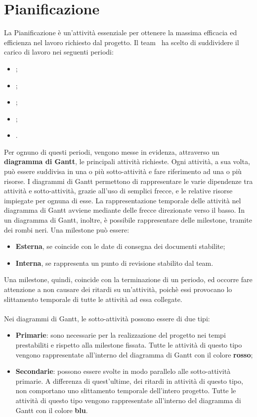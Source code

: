 \newpage

\section{Pianificazione}
La Pianificazione è un'attività essenziale per ottenere la massima efficacia ed efficienza nel lavoro richiesto dal progetto. Il team \gruppo\ ha scelto di suddividere il carico di lavoro nei seguenti periodi:
\begin{itemize}
	\item \textbf{\AR};
	\item \textbf{\PA};
	\item \textbf{\PD};
	\item \textbf{\CO};
	\item \textbf{\VV}.
\end{itemize}
Per ognuno di questi periodi, vengono messe in evidenza, attraverso un \textbf{diagramma di  Gantt}, le principali attività richieste. Ogni attività, a sua volta, può essere suddivisa in una o più sotto-attività e fare riferimento ad una o più risorse. I diagrammi di Gantt permettono di rappresentare le varie dipendenze tra attività e sotto-attività, grazie all’uso di semplici frecce, e le relative risorse impiegate per ognuna di esse. La rappresentazione temporale delle attività nel diagramma di Gantt avviene mediante delle frecce direzionate verso il basso. In un diagramma di Gantt, inoltre, è possibile rappresentare delle milestone, tramite dei rombi neri. Una milestone può essere:
\begin{itemize}
	\item \textbf{Esterna}, se coincide con le date di consegna dei documenti stabilite;
	\item \textbf{Interna}, se rappresenta un punto di revisione stabilito dal team.
\end{itemize}
Una milestone, quindi, coincide con la terminazione di un periodo, ed occorre fare attenzione a non causare dei ritardi su un'attività, poichè essi provocano lo slittamento temporale di tutte le attività ad essa collegate.
\\\\
Nei diagrammi di Gantt, le sotto-attività possono essere di due tipi:
\begin{itemize}
	\item \textbf{Primarie}: sono necessarie per la realizzazione del progetto nei tempi prestabiliti e rispetto alla milestone fissata. Tutte le attività di questo tipo vengono rappresentate all’interno del diagramma di Gantt con il colore \textbf{rosso};
	\item \textbf{Secondarie}: possono essere svolte in modo parallelo alle sotto-attività primarie. A differenza di quest'ultime, dei ritardi in attività di questo tipo, non comportano uno slittamento temporale dell'intero progetto. Tutte le attività di questo tipo vengono rappresentate all’interno del diagramma di Gantt con il colore \textbf{blu}.
\end{itemize}

